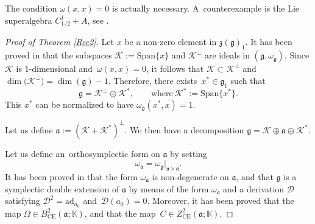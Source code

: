 \documentclass[10pt,a4paper]{amsart}
\numberwithin{equation}{section}
\begin{document}
\begin{Remark}[the condition $\omega(x,x)=0$] The condition $\omega(x,x)=0$ is actually necessary. A~counterexample is the Lie superalgebra $C^1_{1/2}+A$, see \cite{BM}.
\end{Remark}

\begin{proof}[Proof of Theorem \ref{Rec2}]
Let $x$ be a non-zero element in $\mathfrak{z}(\mathfrak{g})_{\bar 1}$. It has been proved in \cite{BM} that the subspaces $\mathscr{K}:=\mathrm{Span}\{x\}$ and $\mathscr{K}^\perp$ are ideals in $(\mathfrak{g},\omega_\mathfrak{g})$. Since $\mathscr{K}$ is 1-dimensional and~$\omega(x,x)=0$, it follows that $\mathscr{K}\subset \mathscr{K}^\perp$ and $\dim\bigl(\mathscr{K}^\perp\bigr)=\dim(\mathfrak{g})-1$. Therefore, there exists~$x^* \in \mathfrak{g}_{\bar 1}$ such that
\[
\mathfrak{g}=\mathscr{K}^\perp\oplus \mathscr{K}^*, \qquad \text{where}\ \mathscr{K}^*:=\mathrm{Span}\{x^*\}.
\]
This $x^*$ can be normalized to have $\omega_\mathfrak{g}(x^*,x)=1$.

Let us define $\mathfrak{a}:=(\mathscr{K} +\mathscr{K}^*)^\perp$. We then have a decomposition $\mathfrak{g}=\mathscr{K} \oplus \mathfrak{a} \oplus \mathscr{K}^*$.

Let us define an~orthosymplectic form on $\mathfrak{a}$ by setting
\[
\omega_\mathfrak{a}={\omega_\mathfrak{g}}\vert_{\mathfrak{a}\times \mathfrak{a}}.
\]
It has been proved in \cite{BM} that the form $\omega_\mathfrak{a}$ is non-degenerate on $\mathfrak{a}$, and that $\mathfrak{g}$ is a symplectic double extension of $\mathfrak{a}$ by means of the form $\omega_\mathfrak{a}$ and a derivation ${\mathscr D}$ satisfying ${\mathscr D}^2=\mathrm{ad}_{a_0}$ and~${\mathscr D}(a_0)=0$. Moreover, it has been proved that the map $\Omega\in B^2_{\text{CE}}(\mathfrak{a}; \mathbb{K})$, and that the map~$C\in Z^2_{\text{CE}}(\mathfrak{a}; \mathbb{K})$.


\end{proof}
\end{document}
